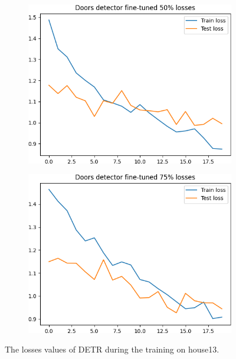 \begin{figure}[h!]
\begin{subfigure}[b]{0.49\linewidth}
	\end{subfigure}
	\newline
	\newline
	\begin{subfigure}[b]{0.49\linewidth}
		\includegraphics[width=\linewidth]{images/house13_finetune50_loss.png}

	\end{subfigure}
	\hfil
	\begin{subfigure}[b]{0.49\linewidth}
		\includegraphics[width=\linewidth]{images/house13_finetune75_loss.png}

	\end{subfigure}
	\caption{The losses values of DETR during the training on \textsf{house13}. }
	\label{fig:house13_losses}
\end{figure}

